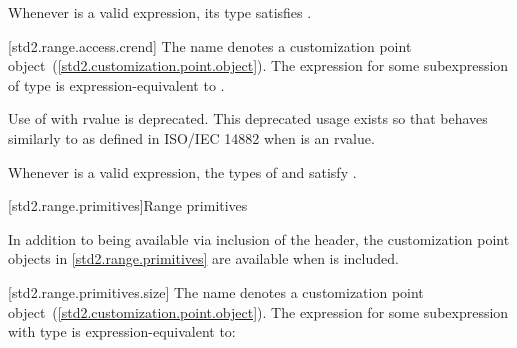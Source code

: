 \pnum
\enternote Whenever  is a valid expression, its
type satisfies . \exitnote

[std2.range.access.crend]{}
\pnum
The name  denotes a customization point
object~(\ref{std2.customization.point.object}). The expression
 for some subexpression  of type 
is expression-equivalent to .

\pnum
Use of  with rvalue  is deprecated.
\enternote This deprecated usage exists so that 
behaves similarly to  as defined in ISO/IEC 14882 when
 is an rvalue. \exitnote

\pnum
\enternote Whenever  is a valid expression, the
types of  and  satisfy
. \exitnote

[std2.range.primitives]{Range primitives}

\pnum
In addition to being available via inclusion of the 
header, the customization point objects in \ref{std2.range.primitives} are
available when  is included.

[std2.range.primitives.size]{}
\pnum
The name  denotes a customization point
object~(\ref{std2.customization.point.object}). The expression
 for some subexpression  with type
 is expression-equivalent to:

